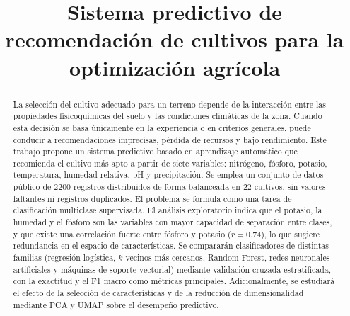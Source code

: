 \documentclass[conference]{IEEEtran}
\begin{document}
\title{Sistema predictivo de recomendación de cultivos para la optimización agrícola}

\author{
\and
{}
\and
{}
}

\maketitle


\begin{abstract}
La selección del cultivo adecuado para un terreno depende de la interacción entre las propiedades fisicoquímicas del suelo y las condiciones climáticas de la zona. Cuando esta decisión se basa únicamente en la experiencia o en criterios generales, puede conducir a recomendaciones imprecisas, pérdida de recursos y bajo rendimiento. Este trabajo propone un sistema predictivo basado en aprendizaje automático que recomienda el cultivo más apto a partir de siete variables: nitrógeno, fósforo, potasio, temperatura, humedad relativa, pH y precipitación. Se emplea un conjunto de datos público de 2200 registros distribuidos de forma balanceada en 22 cultivos, sin valores faltantes ni registros duplicados. El problema se formula como una tarea de clasificación multiclase supervisada. El análisis exploratorio indica que el potasio, la humedad y el fósforo son las variables con mayor capacidad de separación entre clases, y que existe una correlación fuerte entre fósforo y potasio ($r=0.74$), lo que sugiere redundancia en el espacio de características. Se compararán clasificadores de distintas familias (regresión logística, $k$ vecinos más cercanos, Random Forest, redes neuronales artificiales y máquinas de soporte vectorial) mediante validación cruzada estratificada, con la exactitud y el F1 macro como métricas principales. Adicionalmente, se estudiará el efecto de la selección de características y de la reducción de dimensionalidad mediante PCA y UMAP sobre el desempeño predictivo.
\end{abstract}
\end{document}
